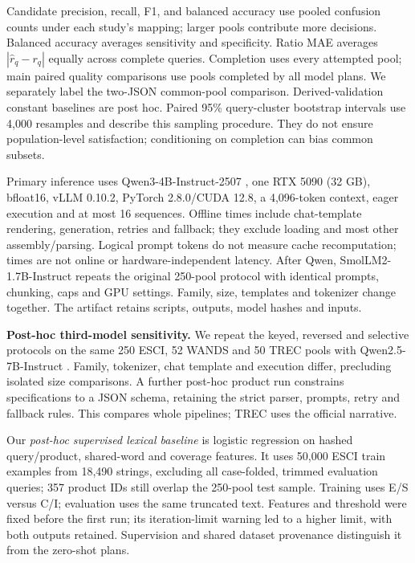 \documentclass[conference]{IEEEtran}
\begin{document}
Candidate precision, recall, F1, and balanced accuracy use pooled confusion counts under each study's mapping; larger pools contribute more decisions. Balanced accuracy averages sensitivity and specificity. Ratio MAE averages $|\hat r_q-r_q|$ equally across complete queries. Completion uses every attempted pool; main paired quality comparisons use pools completed by all model plans. We separately label the two-JSON common-pool comparison. Derived-validation constant baselines are post hoc. Paired 95\% query-cluster bootstrap intervals use 4,000 resamples and describe this sampling procedure. They do not ensure population-level satisfaction; conditioning on completion can bias common subsets.

Primary inference uses Qwen3-4B-Instruct-2507 \cite{qwen}, one RTX 5090 (32 GB), bfloat16, vLLM 0.10.2, PyTorch 2.8.0/CUDA 12.8, a 4,096-token context, eager execution and at most 16 sequences. Offline times include chat-template rendering, generation, retries and fallback; they exclude loading and most other assembly/parsing. Logical prompt tokens do not measure cache recomputation; times are not online or hardware-independent latency. After Qwen, SmolLM2-1.7B-Instruct \cite{smollm} repeats the original 250-pool protocol with identical prompts, chunking, caps and GPU settings. Family, size, templates and tokenizer change together. The artifact retains scripts, outputs, model hashes and inputs.

\textbf{Post-hoc third-model sensitivity.} We repeat the keyed, reversed and selective protocols on the same 250 ESCI, 52 WANDS and 50 TREC pools with Qwen2.5-7B-Instruct \cite{qwen25}. Family, tokenizer, chat template and execution differ, precluding isolated size comparisons. A further post-hoc product run constrains specifications to a JSON schema, retaining the strict parser, prompts, retry and fallback rules. This compares whole pipelines; TREC uses the official narrative.

Our \emph{post-hoc supervised lexical baseline} is logistic regression on hashed query/product, shared-word and coverage features. It uses 50,000 ESCI train examples from 18,490 strings, excluding all case-folded, trimmed evaluation queries; 357 product IDs still overlap the 250-pool test sample. Training uses E/S versus C/I; evaluation uses the same truncated text. Features and threshold were fixed before the first run; its iteration-limit warning led to a higher limit, with both outputs retained. Supervision and shared dataset provenance distinguish it from the zero-shot plans.
\end{document}

